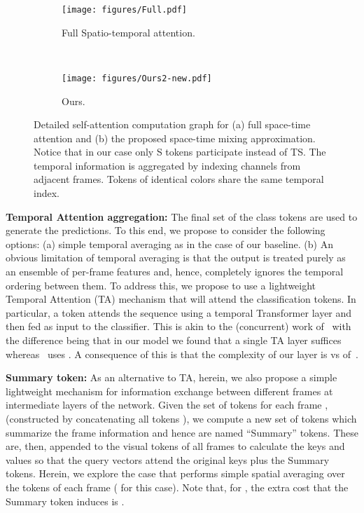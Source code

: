 \documentclass{article}
\begin{document}
\begin{figure}
    \centering
    \begin{subfigure}[b]{0.4\textwidth}
        \centering
        \texttt{[image: figures/Full.pdf]}
        \caption{Full Spatio-temporal attention.}
    \end{subfigure}
    ~
    \begin{subfigure}[b]{0.58\textwidth}
        \centering
        \texttt{[image: figures/Ours2-new.pdf]}
        \caption{Ours.}
    \end{subfigure}

    \caption{Detailed self-attention computation graph for (a) full space-time attention and (b) the proposed space-time mixing approximation. Notice that in our case only S tokens participate instead of TS. The temporal information is aggregated by indexing channels from adjacent frames. Tokens of identical colors share the same temporal index.}
    \label{fig:detailed-diff}
    \vspace*{-0.5cm}
\end{figure}

\noindent\textbf{Temporal Attention aggregation:} The final set of the class tokens   are used to generate the predictions. To this end, we propose to consider the following options: (a) simple temporal averaging   as in the case of our baseline. (b) An obvious limitation of temporal averaging is that the output is treated purely as an ensemble of per-frame features and, hence, completely ignores the temporal ordering between them. To address this, we propose to use a lightweight Temporal Attention (TA) mechanism that will attend the  classification tokens. In particular, a  token attends the sequence  using a temporal Transformer layer and then fed as input to the classifier. This is akin to the (concurrent) work of~\cite{arnab2021vivit} with the difference being that in our model we found that a single TA layer suffices whereas~\cite{arnab2021vivit} uses . A consequence of this is that the complexity of our layer is  vs  of~\cite{arnab2021vivit}.     

\noindent\textbf{Summary token:} As an alternative to TA, herein, we also propose a simple lightweight mechanism for information exchange between different frames at intermediate layers of the network. Given the set of tokens for each frame ,  (constructed by concatenating all tokens ),  we compute a new set of  tokens  which summarize the frame information and hence are named ``Summary'' tokens. These are, then, appended to the visual tokens of all frames to calculate the keys and values so that the query vectors attend the original keys plus the Summary tokens. 
Herein, we explore the case that  performs simple spatial averaging  over the tokens of each frame ( for this case). Note that, for , the extra cost that the Summary token induces is .
\end{document}
